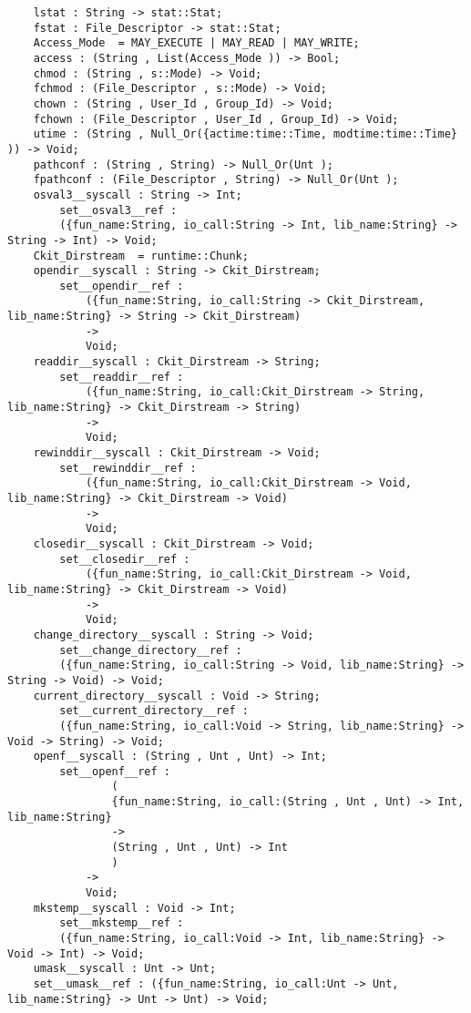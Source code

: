 \begin{verbatim}
    lstat : String -> stat::Stat;
    fstat : File_Descriptor -> stat::Stat;
    Access_Mode  = MAY_EXECUTE | MAY_READ | MAY_WRITE;
    access : (String , List(Access_Mode )) -> Bool;
    chmod : (String , s::Mode) -> Void;
    fchmod : (File_Descriptor , s::Mode) -> Void;
    chown : (String , User_Id , Group_Id) -> Void;
    fchown : (File_Descriptor , User_Id , Group_Id) -> Void;
    utime : (String , Null_Or({actime:time::Time, modtime:time::Time} )) -> Void;
    pathconf : (String , String) -> Null_Or(Unt );
    fpathconf : (File_Descriptor , String) -> Null_Or(Unt );
    osval3__syscall : String -> Int;
        set__osval3__ref :
        ({fun_name:String, io_call:String -> Int, lib_name:String} -> String -> Int) -> Void;
    Ckit_Dirstream  = runtime::Chunk;
    opendir__syscall : String -> Ckit_Dirstream;
        set__opendir__ref :
            ({fun_name:String, io_call:String -> Ckit_Dirstream, lib_name:String} -> String -> Ckit_Dirstream)
            ->
            Void;
    readdir__syscall : Ckit_Dirstream -> String;
        set__readdir__ref :
            ({fun_name:String, io_call:Ckit_Dirstream -> String, lib_name:String} -> Ckit_Dirstream -> String)
            ->
            Void;
    rewinddir__syscall : Ckit_Dirstream -> Void;
        set__rewinddir__ref :
            ({fun_name:String, io_call:Ckit_Dirstream -> Void, lib_name:String} -> Ckit_Dirstream -> Void)
            ->
            Void;
    closedir__syscall : Ckit_Dirstream -> Void;
        set__closedir__ref :
            ({fun_name:String, io_call:Ckit_Dirstream -> Void, lib_name:String} -> Ckit_Dirstream -> Void)
            ->
            Void;
    change_directory__syscall : String -> Void;
        set__change_directory__ref :
        ({fun_name:String, io_call:String -> Void, lib_name:String} -> String -> Void) -> Void;
    current_directory__syscall : Void -> String;
        set__current_directory__ref :
        ({fun_name:String, io_call:Void -> String, lib_name:String} -> Void -> String) -> Void;
    openf__syscall : (String , Unt , Unt) -> Int;
        set__openf__ref :
                (
                {fun_name:String, io_call:(String , Unt , Unt) -> Int, lib_name:String}
                ->
                (String , Unt , Unt) -> Int
                )
            ->
            Void;
    mkstemp__syscall : Void -> Int;
        set__mkstemp__ref :
        ({fun_name:String, io_call:Void -> Int, lib_name:String} -> Void -> Int) -> Void;
    umask__syscall : Unt -> Unt;
    set__umask__ref : ({fun_name:String, io_call:Unt -> Unt, lib_name:String} -> Unt -> Unt) -> Void;

\end{verbatim}

